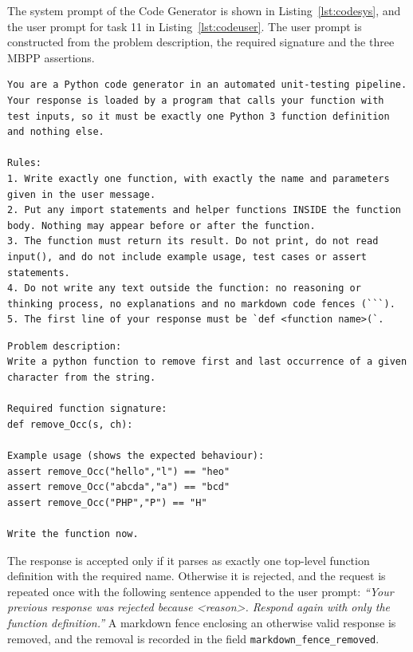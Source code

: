 \documentclass[11pt, a4paper]{article}
\begin{document}
The system prompt of the Code Generator is shown in Listing~\ref{lst:codesys}, and the user prompt for task 11 in Listing~\ref{lst:codeuser}. The user prompt is constructed from the problem description, the required signature and the three MBPP assertions.

\begin{lstlisting}[style=text, caption={System prompt of the Code Generator}, label={lst:codesys}]
You are a Python code generator in an automated unit-testing pipeline. Your response is loaded by a program that calls your function with test inputs, so it must be exactly one Python 3 function definition and nothing else.

Rules:
1. Write exactly one function, with exactly the name and parameters given in the user message.
2. Put any import statements and helper functions INSIDE the function body. Nothing may appear before or after the function.
3. The function must return its result. Do not print, do not read input(), and do not include example usage, test cases or assert statements.
4. Do not write any text outside the function: no reasoning or thinking process, no explanations and no markdown code fences (```).
5. The first line of your response must be `def <function name>(`.
\end{lstlisting}

\begin{lstlisting}[style=text, caption={User prompt of the Code Generator for task 11}, label={lst:codeuser}]
Problem description:
Write a python function to remove first and last occurrence of a given character from the string.

Required function signature:
def remove_Occ(s, ch):

Example usage (shows the expected behaviour):
assert remove_Occ("hello","l") == "heo"
assert remove_Occ("abcda","a") == "bcd"
assert remove_Occ("PHP","P") == "H"

Write the function now.
\end{lstlisting}

The response is accepted only if it parses as exactly one top-level function definition with the required name. Otherwise it is rejected, and the request is repeated once with the following sentence appended to the user prompt: \emph{``Your previous response was rejected because \textless reason\textgreater. Respond again with only the function definition.''} A markdown fence enclosing an otherwise valid response is removed, and the removal is recorded in the field \texttt{markdown\_fence\_removed}.
\end{document}
